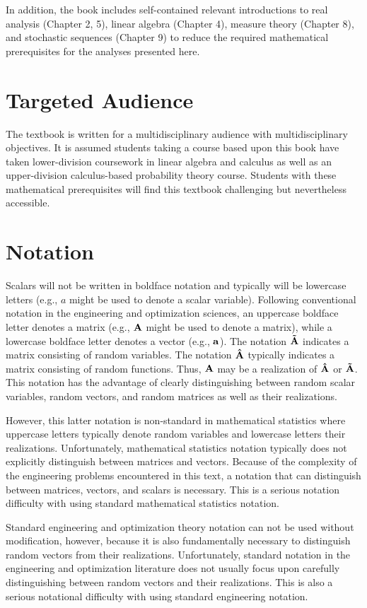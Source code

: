 In addition, the book includes self-contained relevant introductions to 
real analysis (Chapter 2, 5), 
linear algebra (Chapter 4), measure theory (Chapter 8),
and stochastic sequences (Chapter 9) to reduce the required mathematical prerequisites for the analyses presented here.

\section*{Targeted Audience}
The textbook is written for a multidisciplinary audience with multidisciplinary objectives.
It is assumed students taking
a course based upon this book have taken lower-division coursework in linear algebra and calculus
as well as an upper-division calculus-based probability theory course.
Students with these mathematical prerequisites will find this textbook challenging but
nevertheless accessible.

\section*{Notation}
Scalars will not be written in boldface notation and typically will be lowercase letters
(e.g., $a$ might be used to denote a scalar variable).
Following conventional notation in the engineering and optimization sciences, an uppercase
boldface letter  denotes a matrix (e.g., ${\bf A}$ might be used to denote a matrix), 
while a lowercase boldface letter denotes a vector (e.g., ${\bf a}$).
The notation ${\bf\tilde{A}}$ indicates a matrix consisting of random
variables. The notation ${\bf \hat{A}}$ typically indicates a matrix consisting of random functions.
Thus, ${\bf A}$ may be a realization of $\bf\hat{A}$ or $\bf\tilde{A}$. 
This notation has the advantage of clearly distinguishing between 
random scalar variables, random vectors, and random matrices as well as their realizations.

However, this latter notation is non-standard in mathematical statistics
where uppercase letters typically denote random variables and lowercase letters their realizations.
Unfortunately, mathematical statistics notation typically does not explicitly distinguish between
matrices and vectors. Because of the complexity of the engineering problems encountered in this
text, a notation that can distinguish between matrices, vectors, and scalars is necessary. This is
a serious notation difficulty with using standard mathematical statistics notation.

Standard engineering and optimization theory notation can not be used without modification, however,
because it is also fundamentally necessary to distinguish random vectors from their realizations.
Unfortunately, standard notation in the engineering and optimization literature does not usually
focus upon carefully distinguishing between random vectors and their realizations. This is also
a serious notational difficulty with using standard engineering notation.

